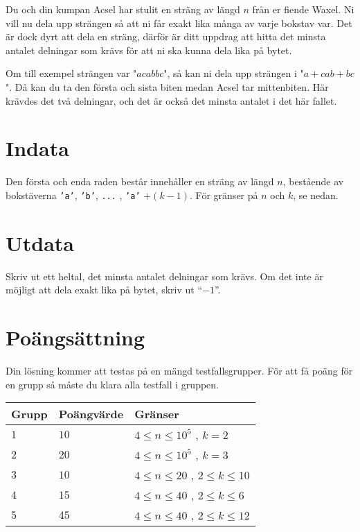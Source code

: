 Du och din kumpan Acsel har stulit en sträng av längd $n$ från er fiende Waxel. Ni vill nu dela upp strängen så att ni får
exakt lika många av varje bokstav var. Det är dock dyrt att dela en sträng, därför är ditt uppdrag att hitta det minsta antalet delningar som krävs för att ni ska kunna dela lika på bytet.

Om till exempel strängen var "$\textit{acabbc}$", så kan ni dela upp strängen i
"$\textit{a}+\textit{cab}+\textit{bc}$". Då kan du ta den första och sista biten medan Acsel tar mittenbiten. Här krävdes det två delningar,
och det är också det minsta antalet i det här fallet.

\section*{Indata}
Den första och enda raden består innehåller en sträng av längd $n$, bestående av bokstäverna \texttt{'a'}, \texttt{'b'}, \texttt{...} , \texttt{'a'} $+(k-1)$. För gränser på $n$ och $k$, se nedan.

\section*{Utdata}
Skriv ut ett heltal, det minsta antalet delningar som krävs. Om det inte är möjligt att dela exakt lika på bytet, skriv ut ``$-1$''.

\section*{Poängsättning}
Din lösning kommer att testas på en mängd testfallsgrupper.
För att få poäng för en grupp så måste du klara alla testfall i gruppen.

\noindent
\begin{tabular}{| l | l | p{12cm} |}
  \hline
  Grupp & Poängvärde & Gränser \\ \hline
  $1$   & $10$       & $4 \le n \le 10^5$ , $k = 2$ \\ \hline
  $2$   & $20$       & $4 \le n \le 10^5$ , $k = 3$ \\ \hline
  $3$   & $10$       & $4 \le n \le 20$ , $2 \leq k \leq 10$ \\ \hline
  $4$   & $15$       & $4 \le n \le 40$ , $2 \leq k \leq 6$ \\ \hline
  $5$   & $45$       & $4 \le n \le 40$ , $2 \leq k \leq 12$ \\ \hline
\end{tabular}

